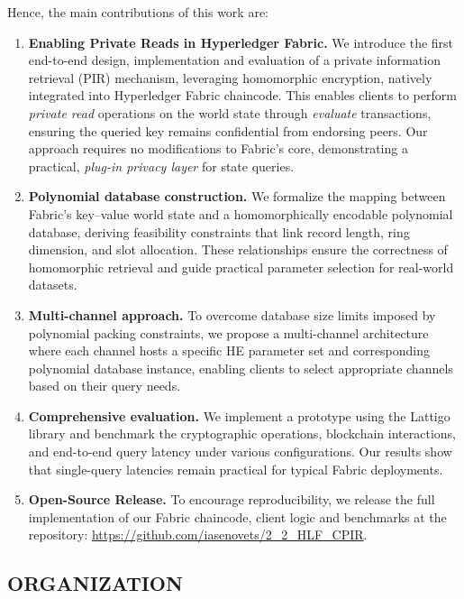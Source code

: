 \documentclass{ieeetj}
\begin{document}
Hence, the main contributions of this work are:
\begin{enumerate}
    \item \textbf{Enabling Private Reads in Hyperledger Fabric.} 
    We introduce the first end-to-end design, implementation and evaluation of a private information retrieval (PIR) mechanism, 
    leveraging homomorphic encryption, natively integrated into Hyperledger Fabric chaincode. This enables clients to perform \emph{private read} 
    operations on the world state through \emph{evaluate} transactions, ensuring the queried key remains confidential from endorsing peers.
    Our approach requires no modifications to Fabric’s core, demonstrating a practical, \emph{plug-in privacy layer} for state queries.
    \item \textbf{Polynomial database construction.}
    We formalize the mapping between Fabric’s key–value world state and a homomorphically encodable polynomial database, 
    deriving feasibility constraints that link record length, ring dimension, and slot allocation. 
    These relationships ensure the correctness of homomorphic retrieval and guide practical parameter selection for real-world datasets.
    \item \textbf{Multi-channel approach.} 
    To overcome database size limits imposed by polynomial packing constraints, we propose a multi-channel architecture 
    where each channel hosts a specific HE parameter set and corresponding polynomial database instance, 
    enabling clients to select appropriate channels based on their query needs.
    \item \textbf{Comprehensive evaluation.} 
    We implement a prototype using the Lattigo~\cite{noauthor_lattigo_2024} library and benchmark the cryptographic operations, 
    blockchain interactions, and end-to-end query latency under various configurations. Our results show that single-query latencies 
    remain practical for typical Fabric deployments.
    \item \textbf{Open-Source Release.} To encourage reproducibility, we release the full implementation of our Fabric 
    chaincode, client logic and benchmarks at the repository: \url{https://github.com/iasenovets/2_2_HLF_CPIR}.
\end{enumerate}

\subsection{ORGANIZATION}
\end{document}
